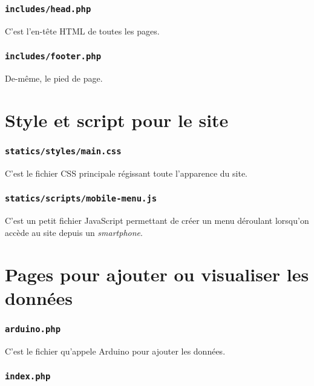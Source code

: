 \cprotect\subsubsection{\verb-includes/head.php-}

C'est l'en-tête HTML de toutes les pages.

\cprotect\subsubsection{\verb-includes/footer.php-}

De-même, le pied de page.

\section{Style et script pour le site}

\cprotect\subsubsection{\verb-statics/styles/main.css-}

C'est le fichier CSS principale régissant toute l'apparence du site.

\cprotect\subsubsection{\verb|statics/scripts/mobile-menu.js|}

C'est un petit fichier JavaScript permettant de créer un menu déroulant lorsqu'on accède au site depuis un \emph{smartphone}.

\section{Pages pour ajouter ou visualiser les données}

\cprotect\subsubsection{\verb-arduino.php-}

C'est le fichier qu'appele Arduino pour ajouter les données.

\cprotect\subsubsection{\verb-index.php-}

